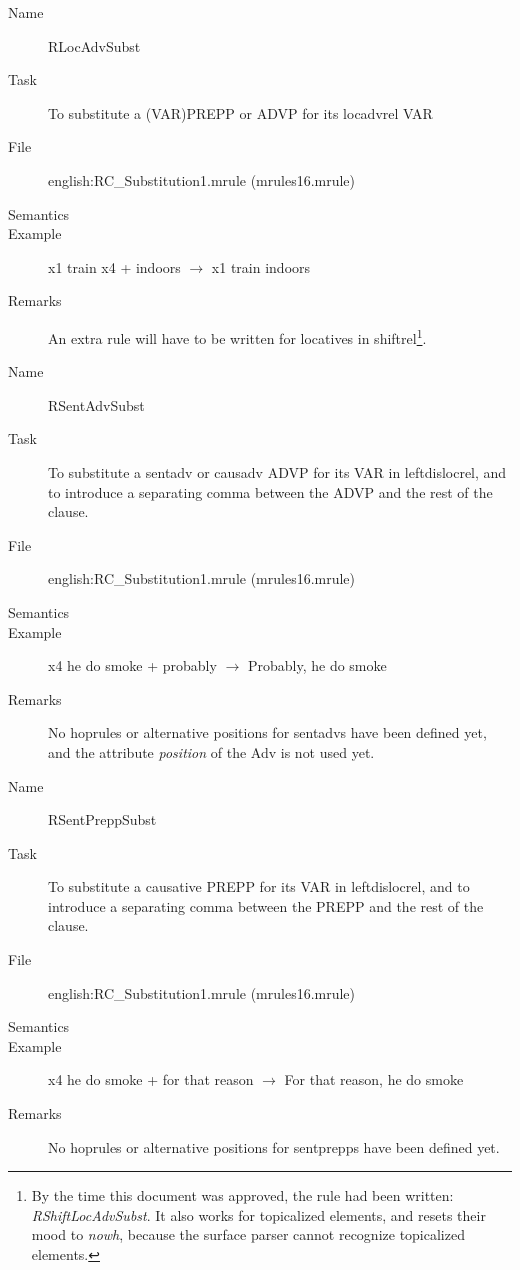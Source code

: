 \begin{description}
\vspace{1 cm}
\begin{description}
\item[Name] RLocAdvSubst
\item[Task] To substitute a (VAR)PREPP or ADVP for its locadvrel VAR
\item[File] english:RC\_Substitution1.mrule (mrules16.mrule)
\item[Semantics]
\item[Example] x1 train x4 + indoors $\rightarrow$ x1 train indoors
\item[Remarks] An extra rule will have to be written for locatives in 
shiftrel\footnote{By the time this document was approved, the rule had 
been written: {\em RShiftLocAdvSubst\/}. It also works for topicalized 
elements, and resets their mood to {\em nowh\/}, because the surface parser 
cannot recognize topicalized elements.}.
\end{description}

\vspace{1 cm}
\begin{description}
\item[Name] RSentAdvSubst
\item[Task] To substitute a sentadv or causadv ADVP for its VAR in 
leftdislocrel, and to introduce a separating comma between the ADVP and the 
rest of the clause.
\item[File] english:RC\_Substitution1.mrule (mrules16.mrule)
\item[Semantics]
\item[Example] x4 he do smoke + probably $\rightarrow$ Probably, he do smoke
\item[Remarks] No hoprules or alternative positions for sentadvs have been 
defined yet, and the attribute {\em position\/} of the Adv is not used yet.
\end{description}

\vspace{1 cm}
\begin{description}
\item[Name] RSentPreppSubst
\item[Task] To substitute a causative PREPP for its VAR in leftdislocrel,
and to introduce a separating comma between the PREPP and the 
rest of the clause.
\item[File] english:RC\_Substitution1.mrule (mrules16.mrule)
\item[Semantics]
\item[Example] x4 he do smoke + for that reason $\rightarrow$ For that reason, 
he do smoke
\item[Remarks] No hoprules or alternative positions for sentprepps have been 
defined yet.
\end{description}


\end{description}
